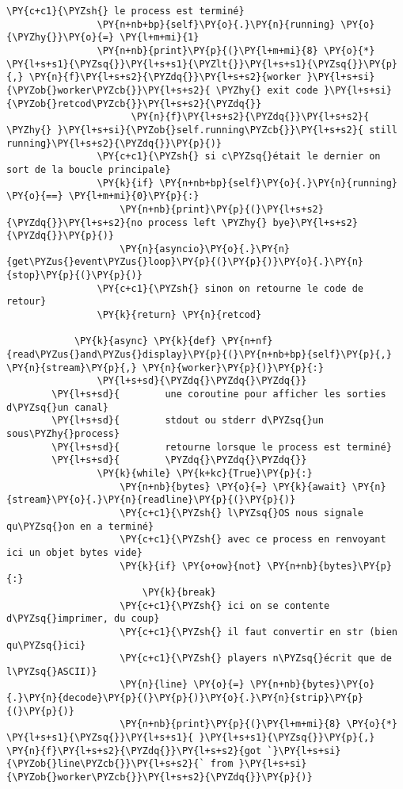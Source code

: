 \begin{Verbatim}[commandchars=\\\{\},frame=single,framerule=0.3mm,rulecolor=\color{cellframecolor}]
                \PY{c+c1}{\PYZsh{} le process est terminé}
                \PY{n+nb+bp}{self}\PY{o}{.}\PY{n}{running} \PY{o}{\PYZhy{}}\PY{o}{=} \PY{l+m+mi}{1}
                \PY{n+nb}{print}\PY{p}{(}\PY{l+m+mi}{8} \PY{o}{*} \PY{l+s+s1}{\PYZsq{}}\PY{l+s+s1}{\PYZlt{}}\PY{l+s+s1}{\PYZsq{}}\PY{p}{,} \PY{n}{f}\PY{l+s+s2}{\PYZdq{}}\PY{l+s+s2}{worker }\PY{l+s+si}{\PYZob{}worker\PYZcb{}}\PY{l+s+s2}{ \PYZhy{} exit code }\PY{l+s+si}{\PYZob{}retcod\PYZcb{}}\PY{l+s+s2}{\PYZdq{}}
                      \PY{n}{f}\PY{l+s+s2}{\PYZdq{}}\PY{l+s+s2}{ \PYZhy{} }\PY{l+s+si}{\PYZob{}self.running\PYZcb{}}\PY{l+s+s2}{ still running}\PY{l+s+s2}{\PYZdq{}}\PY{p}{)}
                \PY{c+c1}{\PYZsh{} si c\PYZsq{}était le dernier on sort de la boucle principale}
                \PY{k}{if} \PY{n+nb+bp}{self}\PY{o}{.}\PY{n}{running} \PY{o}{==} \PY{l+m+mi}{0}\PY{p}{:}
                    \PY{n+nb}{print}\PY{p}{(}\PY{l+s+s2}{\PYZdq{}}\PY{l+s+s2}{no process left \PYZhy{} bye}\PY{l+s+s2}{\PYZdq{}}\PY{p}{)}
                    \PY{n}{asyncio}\PY{o}{.}\PY{n}{get\PYZus{}event\PYZus{}loop}\PY{p}{(}\PY{p}{)}\PY{o}{.}\PY{n}{stop}\PY{p}{(}\PY{p}{)}
                \PY{c+c1}{\PYZsh{} sinon on retourne le code de retour}
                \PY{k}{return} \PY{n}{retcod}
        
            \PY{k}{async} \PY{k}{def} \PY{n+nf}{read\PYZus{}and\PYZus{}display}\PY{p}{(}\PY{n+nb+bp}{self}\PY{p}{,} \PY{n}{stream}\PY{p}{,} \PY{n}{worker}\PY{p}{)}\PY{p}{:}
                \PY{l+s+sd}{\PYZdq{}\PYZdq{}\PYZdq{}}
        \PY{l+s+sd}{        une coroutine pour afficher les sorties d\PYZsq{}un canal}
        \PY{l+s+sd}{        stdout ou stderr d\PYZsq{}un sous\PYZhy{}process}
        \PY{l+s+sd}{        retourne lorsque le process est terminé}
        \PY{l+s+sd}{        \PYZdq{}\PYZdq{}\PYZdq{}}
                \PY{k}{while} \PY{k+kc}{True}\PY{p}{:}
                    \PY{n+nb}{bytes} \PY{o}{=} \PY{k}{await} \PY{n}{stream}\PY{o}{.}\PY{n}{readline}\PY{p}{(}\PY{p}{)}
                    \PY{c+c1}{\PYZsh{} l\PYZsq{}OS nous signale qu\PYZsq{}on en a terminé}
                    \PY{c+c1}{\PYZsh{} avec ce process en renvoyant ici un objet bytes vide}
                    \PY{k}{if} \PY{o+ow}{not} \PY{n+nb}{bytes}\PY{p}{:}
                        \PY{k}{break}
                    \PY{c+c1}{\PYZsh{} ici on se contente d\PYZsq{}imprimer, du coup}
                    \PY{c+c1}{\PYZsh{} il faut convertir en str (bien qu\PYZsq{}ici}
                    \PY{c+c1}{\PYZsh{} players n\PYZsq{}écrit que de l\PYZsq{}ASCII)}
                    \PY{n}{line} \PY{o}{=} \PY{n+nb}{bytes}\PY{o}{.}\PY{n}{decode}\PY{p}{(}\PY{p}{)}\PY{o}{.}\PY{n}{strip}\PY{p}{(}\PY{p}{)}
                    \PY{n+nb}{print}\PY{p}{(}\PY{l+m+mi}{8} \PY{o}{*} \PY{l+s+s1}{\PYZsq{}}\PY{l+s+s1}{ }\PY{l+s+s1}{\PYZsq{}}\PY{p}{,} \PY{n}{f}\PY{l+s+s2}{\PYZdq{}}\PY{l+s+s2}{got `}\PY{l+s+si}{\PYZob{}line\PYZcb{}}\PY{l+s+s2}{` from }\PY{l+s+si}{\PYZob{}worker\PYZcb{}}\PY{l+s+s2}{\PYZdq{}}\PY{p}{)}
        

\end{Verbatim}
